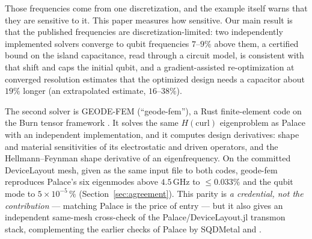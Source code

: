 \documentclass{anvil-paper}
\begin{document}
Those frequencies come from one discretization, and the example itself
warns that they are sensitive to it. This paper measures how sensitive.
Our main result is that the published frequencies are
discretization-limited: two independently implemented solvers converge to
qubit frequencies $7$--$9\%$ above them, a certified bound on the island
capacitance, read through a circuit model, is consistent with that shift
and caps the initial qubit, and a gradient-assisted re-optimization at
converged resolution estimates that the optimized design needs a capacitor
about $19\%$ longer (an extrapolated estimate, $16$--$38\%$).

The second solver is GEODE-FEM (``geode-fem''), a Rust finite-element code
on the Burn tensor framework \citep{burn}. It solves the same
$H(\mathrm{curl})$ eigenproblem as Palace with an independent
implementation, and it computes design derivatives: shape and material
sensitivities of its electrostatic and driven operators, and the
Hellmann--Feynman shape derivative of an eigenfrequency. On the
committed DeviceLayout mesh, given as the same input file to both codes,
geode-fem reproduces Palace's six eigenmodes above $4.5$\,GHz to
$\leq 0.033\%$ and the qubit mode to $5\times10^{-5}\,\%$
(Section~\ref{sec:agreement}).
This parity is \emph{a credential, not the contribution} --- matching
Palace is the price of entry --- but it also gives an independent
same-mesh cross-check of the Palace/DeviceLayout.jl transmon stack,
complementing the earlier checks of Palace by SQDMetal
\citep{sommers2025open} and \citet{ye2025electromagnetic}.
\end{document}
